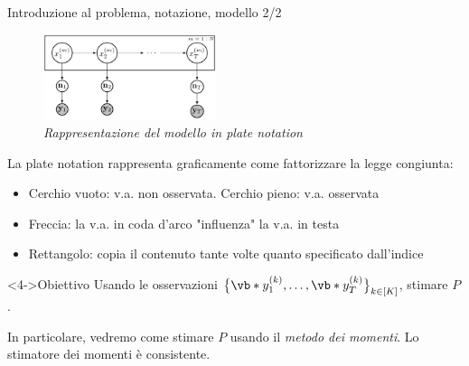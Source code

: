 \documentclass[10pt,xcolor={table,dvipsnames}]{beamer} 		%
\theoremstyle{plain}					%
\theoremstyle{definition}
\theoremstyle{remark}
\begin{document}
	\begin{frame}{Introduzione al problema, notazione, modello 2/2}
		\begin{figure}[ht]
			\centering
			\includegraphics[width=0.45\textwidth]{Immagini/plate_model.png}
			\caption{\emph{Rappresentazione del modello in plate notation}}
		\end{figure}

		\vspace*{-0.5\baselineskip}
		La plate notation rappresenta graficamente come fattorizzare la legge congiunta:
		\begin{itemize}
			\item Cerchio vuoto: v.a. non osservata. Cerchio pieno: v.a. osservata
			\item<2-> Freccia: la v.a. in coda d'arco "influenza" la v.a. in testa
			\item<3-> Rettangolo: copia il contenuto tante volte quanto specificato dall'indice
		\end{itemize}

		\begin{alertblock}<4->{Obiettivo}
			Usando le osservazioni
			$\big\{\vb*{y}_1^{(k)},\dots,\vb*{y}_T^{(k)}\big\}_{k\in [K]}$, stimare $P$.

			In particolare, vedremo come stimare $P$ usando il \emph{metodo dei momenti}.
			Lo stimatore dei momenti è consistente. 
		\end{alertblock}

	\end{frame}
\end{document}
